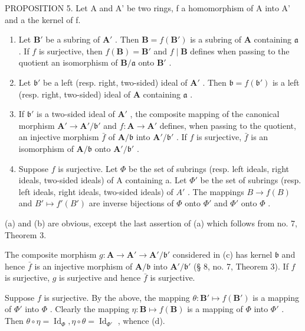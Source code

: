 PROPOSITION 5. Let A and A' be two rings, f a homomorphism of A into A' and a the kernel of f.

\begin{enumerate}
\def\labelenumi{(\alph{enumi})}
\item
  Let \(\mathbf{B}'\) be a subring of \(\mathbf{A}'\) . Then \(\mathbf{B} = f(\mathbf{B}')\) is a subring of \(\mathbf{A}\) containing \(\mathfrak{a}\) . If \(f\) is surjective, then \(f(\mathbf{B}) = \mathbf{B}'\) and \(f \mid \mathbf{B}\) defines when passing to the quotient an isomorphism of \(\mathbf{B}/\mathfrak{a}\) onto \(\mathbf{B}'\) .
\item
  Let \(\mathfrak{b}'\) be a left (resp. right, two-sided) ideal of \(\mathbf{A}'\) . Then \(\mathfrak{b} = f(\mathfrak{b}')\) is a left (resp. right, two-sided) ideal of \(\mathbf{A}\) containing \(\mathfrak{a}\) .
\item
  If \(\mathfrak{b}'\) is a two-sided ideal of \(\mathbf{A}'\) , the composite mapping of the canonical morphism \(\mathbf{A}' \to \mathbf{A}' / \mathfrak{b}'\) and \(f: \mathbf{A} \to \mathbf{A}'\) defines, when passing to the quotient, an injective morphism \(\bar{f}\) of \(\mathbf{A} / \mathfrak{b}\) into \(\mathbf{A}' / \mathfrak{b}'\) . If \(f\) is surjective, \(\bar{f}\) is an isomorphism of \(\mathbf{A} / \mathfrak{b}\) onto \(\mathbf{A}' / \mathfrak{b}'\) .
\item
  Suppose \(f\) is surjective. Let \(\Phi\) be the set of subrings (resp. left ideals, right ideals, two-sided ideals) of A containing a. Let \(\Phi'\) be the set of subrings (resp. left ideals, right ideals, two-sided ideals) of \(A'\) . The mappings \(B \to f(B)\) and \(B' \mapsto f'(B')\) are inverse bijections of \(\Phi\) onto \(\Phi'\) and \(\Phi'\) onto \(\Phi\) .
\end{enumerate}

(a) and (b) are obvious, except the last assertion of (a) which follows from no. 7, Theorem 3.

The composite morphism \(g: \mathbf{A} \to \mathbf{A}' \to \mathbf{A}' / \mathfrak{b}'\) considered in (c) has kernel \(\mathfrak{b}\) and hence \(\bar{f}\) is an injective morphism of \(\mathbf{A} / \mathfrak{b}\) into \(\mathbf{A}' / \mathfrak{b}'\) (§ 8, no. 7, Theorem 3). If \(f\) is surjective, \(g\) is surjective and hence \(\bar{f}\) is surjective.

Suppose \(f\) is surjective. By the above, the mapping \(\theta: \mathbf{B}' \mapsto f(\mathbf{B}')\) is a mapping of \(\Phi'\) into \(\Phi\) . Clearly the mapping \(\eta: \mathbf{B} \mapsto f(\mathbf{B})\) is a mapping of \(\Phi\) into \(\Phi'\) . Then \(\theta \circ \eta = \operatorname{Id}_{\Phi}, \eta \circ \theta = \operatorname{Id}_{\Phi'}\) , whence (d).

